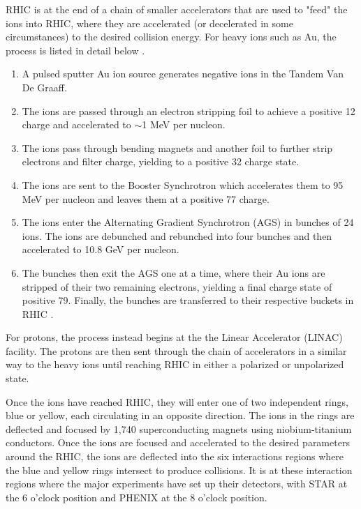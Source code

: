 RHIC is at the end of a chain of smaller accelerators that are used to "feed" the ions into RHIC, where they are accelerated (or decelerated in some circumstances) to the desired collision energy. For heavy ions such as Au, the process is listed in detail below \cite{ROSER200223}.
\begin{enumerate}
  \item{} A pulsed sputter Au ion source generates negative ions in the Tandem Van De Graaff.
  \item{} The ions are passed through an electron stripping foil to achieve a positive 12 charge and accelerated to $\sim$1 MeV per nucleon.
  \item{} The ions pass through bending magnets and another foil to further strip electrons and filter charge, yielding to a positive 32 charge state.
  \item{} The ions are sent to the Booster Synchrotron which accelerates them to 95 MeV per nucleon and leaves them at a positive 77 charge.
  \item{} The ions enter the Alternating Gradient Synchrotron (AGS) in bunches of 24 ions. The ions are debunched and rebunched into four bunches and then accelerated to 10.8 GeV per nucleon.
  \item{}  The bunches then exit the AGS one at a time, where their Au ions are stripped of their two remaining electrons, yielding a final charge state of positive 79. Finally, the bunches are transferred to their respective buckets in RHIC . 
\end{enumerate}

For protons, the process instead begins at the the Linear Accelerator (LINAC) facility. The protons are then sent through the chain of accelerators in a similar way to the heavy ions until reaching RHIC in either a polarized or unpolarized state. 

Once the ions have reached RHIC, they will enter one of two independent rings, blue or yellow, each circulating in an opposite direction. The ions in the rings are deflected and focused by 1,740 superconducting magnets using niobium-titanium conductors. Once the ions are focused and accelerated to the desired parameters around the RHIC, the ions are deflected into the six interactions regions where the blue and yellow rings intersect to produce collisions. It is at these interaction regions where the major experiments have set up their detectors, with STAR at the 6 o'clock position and PHENIX at the 8 o'clock position.


